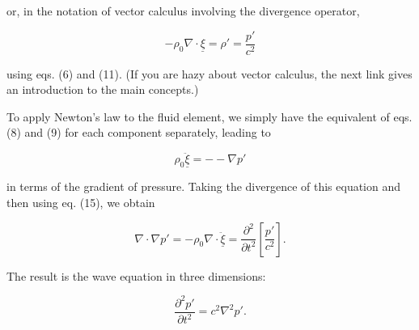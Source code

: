   \noindent{}or, in the notation of vector calculus involving the divergence 
  operator, 

  \begin{equation*}-\rho_0 \nabla \cdot \underline{\xi} = \rho' = 
  \frac{p'}{c^2} \tag{15}\end{equation*} 

  \noindent{}using eqs. (6) and (11). (If you are hazy about vector calculus, 
  the next link gives an introduction to the main concepts.) 

  To apply Newton's law to the fluid element, we simply have the equivalent of 
  eqs. (8) and (9) for each component separately, leading to 

  \begin{equation*}\rho_0 \ddot{\underline{\xi}} = -- \nabla p' 
  \tag{16}\end{equation*} 

  \noindent{}in terms of the gradient of pressure. Taking the divergence of 
  this equation and then using eq. (15), we obtain 

  \begin{equation*}\nabla \cdot \nabla p' = -\rho_0 \nabla \cdot 
  \ddot{\underline{\xi}} = \frac{\partial^2}{\partial t^2} \left[ 
  \frac{p'}{c^2} \right] . \tag{17}\end{equation*} 

  The result is the wave equation in three dimensions: 

  \begin{equation*}\frac{\partial^2 p'}{\partial t^2} = c^2 \nabla^2 p' 
  .\tag{18}\end{equation*} 